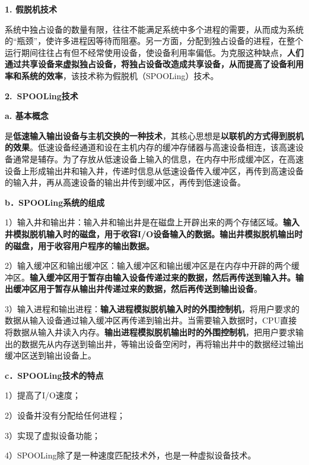 \textbf{{1. 假脱机技术}}

系统中独占设备的数量有限，往往不能满足系统中多个进程的需要，从而成为系统的``瓶颈''，使许多进程因等待而阻塞。另一方面，分配到独占设备的进程，在整个运行期间往往占有但不经常使用设备，使设备利用率偏低。为克服这种缺点，\textbf{人们通过共享设备来虚拟独占设备，将独占设备改造成共享设备，从而提高了设备利用率和系统的效率}，该技术称为假脱机（SPOOLing）技术。

\textbf{{2.~}\textbf{{SPOOLing技术}}{}}

{\textbf{a. 基本概念}}

是\textbf{{低速输入输出设备与主机交换的一种技术}}，其核心思想是\textbf{{以联机的方式得到脱机的效果}}。低速设备经通道和设在主机内存的缓冲存储器与高速设备相连，该高速设备通常是辅存。为了存放从低速设备上输入的信息，在内存中形成缓冲区，在高速设备上形成输出井和输入井，传递时信息从低速设备传入缓冲区，再传到高速设备的输入井，再从高速设备的输出井传到缓冲区，再传到低速设备。

\textbf{{b．SPOOLing系统的组成}}

1）输入井和输出井：输入井和输出井是在磁盘上开辟出来的两个存储区域。\textbf{输入井模拟脱机输入时的磁盘，用于收容I/O设备输入的数据。输出井模拟脱机输出时的磁盘，用于收容用户程序的输出数据。}

2）输入缓冲区和输出缓冲区：输入缓冲区和输出缓冲区是在内存中开辟的两个缓冲区。\textbf{输入缓冲区用于暂存由输入设备传递过来的数据，然后再传送到输入井。输出缓冲区用于暂存从输出井传递过来的数据，然后再传送到输出设备}。

3）输入进程和输出进程：\textbf{输入进程模拟脱机输入时的外围控制机}，将用户要求的数据从输入设备通过输入缓冲区再传递到输出井。当需要输入数据时，CPU直接将数据从输入井读入内存。{\textbf{输出进程}}{\textbf{模拟}}{\textbf{脱机输出时的外围控制机}，把用户要求输出的数据先从内存送到输出井，等输出设备空闲时，再将输出井中的数据经过输出缓冲区送到输出设备上。}

\textbf{{c．SPOOLing技术的特点}}

{1）提高了I/O速度；}

{2）设备并没有分配给任何进程；}

{3）实现了虚拟设备功能；}

{4）SPOOLing除了是一种速度匹配技术外，也是一种虚拟设备技术。}
